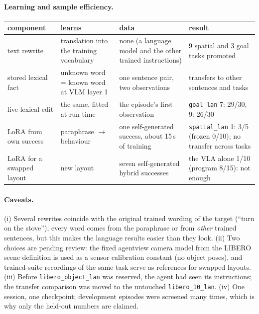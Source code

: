 \documentclass[11pt]{article}
\begin{document}
\paragraph{Learning and sample efficiency.}
\begin{center}\small
\begin{tabular}{p{3.6cm}p{3.6cm}p{3.6cm}p{3.6cm}}
\toprule
component & learns & data & result \\
\midrule
text rewrite & translation into the training vocabulary & none (a language model and the other trained instructions) & 9 spatial and 3 goal tasks promoted \\
stored lexical fact & unknown word = known word at VLM layer 1 & one sentence pair, two observations & transfers to other sentences and tasks \\
live lexical edit & the same, fitted at run time & the episode's first observation & \texttt{goal\_lan} 7: 29/30, 9: 26/30 \\
LoRA from own success & paraphrase $\to$ behaviour & one self-generated success, about 15\,s of training & \texttt{spatial\_lan} 1: 3/5 (frozen 0/10); no transfer across tasks \\
LoRA for a swapped layout & new layout & seven self-generated hybrid successes & the VLA alone 1/10 (program 8/15): not enough \\
\bottomrule
\end{tabular}
\end{center}

\paragraph{Caveats.} (i) Several rewrites coincide with the original trained wording of the target (``turn on the stove''); every
word comes from the paraphrase or from \emph{other} trained sentences, but this makes the language results easier than they look.
(ii) Two choices are pending review: the fixed agentview camera model from the LIBERO scene definition is used as a sensor
calibration constant (no object poses), and trained-suite recordings of the same task serve as references for swapped layouts.
(iii) Before \texttt{libero\_object\_lan} was reserved, the agent had seen its instructions; the transfer comparison was moved to
the untouched \texttt{libero\_10\_lan}. (iv) One session, one checkpoint; development episodes were screened many times, which is why
only the held-out numbers are claimed.
\end{document}
